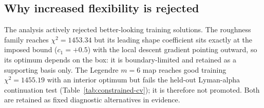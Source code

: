 \subsection{Why increased flexibility is rejected}
\label{sec:diagnostic-alternatives}

The analysis actively rejected better-looking training solutions. The
roughness family reaches $\chi^{2}=1453.34$ but its leading shape
coefficient sits exactly at the imposed bound ($c_{1}=+0.5$) with
the local descent gradient pointing outward, so its optimum depends
on the box: it is boundary-limited and retained as a supporting
basis only. The Legendre $m=6$ map reaches good training
$\chi^{2}=1455.19$ with an interior optimum but fails the held-out
Lyman-alpha continuation test (Table~\ref{tab:constrained-cv});
it is therefore not promoted.
Both are retained as fixed diagnostic alternatives in
evidence.

